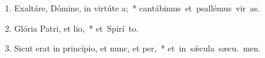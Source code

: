 \begin{flushleft}
\begin{enumerate}[leftmargin=*]
\item Exaltáre, Dómine, in virtúte a;~* \mbox{cantábimus et psallémus vir as.}

\item Glória Patri, et lio,~* \mbox{et Spirí to.}

\item Sicut erat in princípio, et nunc, et per,~* \mbox{et in s\'{\ae}cula sæcu. men.}

\end{enumerate}
\end{flushleft}

